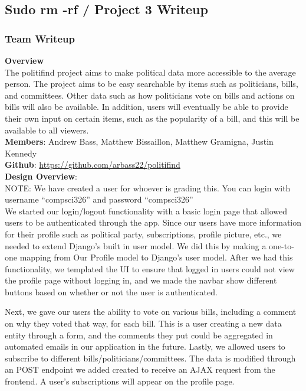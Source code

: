 \documentclass{article}
\newcommand{\n}{\noindent}
\begin{document}
\begin{center}
\subsection*{Sudo rm -rf / Project 3 Writeup}
\end{center}

\subsubsection*{Team Writeup}

\textbf{Overview} \\

The politifind project aims to make political data more accessible to the average person. The project aims to be easy searchable by items such as politicians, bills, and committees. Other data such as how politicians vote on bills and actions on bills will also be available. In addition, users will eventually be able to provide their own input on certain items, such as the popularity of a bill, and this will be available to all viewers. \\

\n\textbf{Members}: Andrew Bass, Matthew Bissaillon, Matthew Gramigna, Justin Kennedy \\

\n\textbf{Github}: \url{https://github.com/arbass22/politifind} \\

\n\textbf{Design Overview}: \\

\n NOTE: We have created a user for whoever is grading this. You can login with username ``compsci326'' and password ``compsci326'' \\

We started our login/logout functionality with a basic login page that allowed users to be authenticated through the app. Since our users have more information for their profile such as political party, subscriptions, profile picture, etc., we needed to extend Django's built in user model. We did this by making a one-to-one mapping from Our Profile model to Django's user model. After we had this functionality, we templated the UI to ensure that logged in users could not view the profile page without logging in, and we made the navbar show different buttons based on whether or not the user is authenticated.

Next, we gave our users the ability to vote on various bills, including a comment on why they voted that way, for each bill. This is a user creating a new data entity through a form, and the comments they put could be aggregated in automated emails in our application in the future.  Lastly, we allowed users to subscribe to different bills/politicians/committees. The data is modified through an POST endpoint we added created to receive an AJAX request from the frontend.   A user's subscriptions will appear on the profile page.\\
\end{document}
